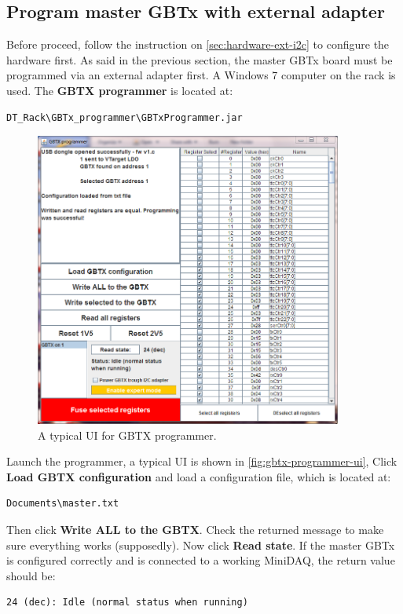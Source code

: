 \subsection{Program master GBTx with external \itwoc adapter}
Before proceed, follow the instruction on \autoref{sec:hardware-ext-i2c} to
configure the hardware first.
As said in the previous section, the master GBTx board must be programmed via an
external \itwoc adapter first.
A Windows 7 computer on the rack is used. The \textbf{GBTX programmer} is
located at:

\begin{lstlisting}
DT_Rack\GBTx_programmer\GBTxProgrammer.jar
\end{lstlisting}

\begin{figure}[ht]
    \centering
    \includegraphics[width=0.9\textwidth]{res/gbtx_programmer_v1_ui.png}
    \caption{A typical UI for GBTX programmer.}
    \label{fig:gbtx-programmer-ui}
\end{figure}

Launch the programmer, a typical UI is shown in
\autoref{fig:gbtx-programmer-ui},
Click \textbf{Load GBTX configuration} and load a configuration file, which is
located at:

\begin{lstlisting}
Documents\master.txt
\end{lstlisting}

Then click \textbf{Write ALL to the GBTX}. Check the returned message to make
sure everything works (supposedly).
Now click \textbf{Read state}.
If the master GBTx is configured correctly and is connected to a working
MiniDAQ, the return value should be:

\begin{lstlisting}
24 (dec): Idle (normal status when running)
\end{lstlisting}

